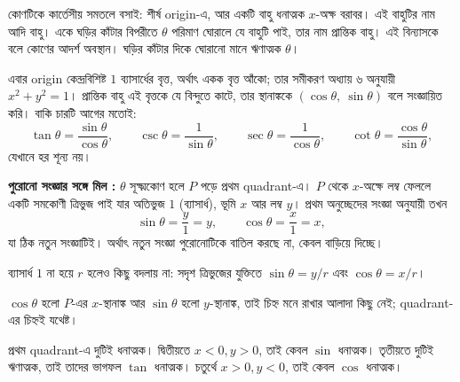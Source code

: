 \documentclass[11pt]{article}
\begin{document}
\begin{idea}
কোণটিকে কার্তেসীয় সমতলে বসাই: শীর্ষ origin-এ, আর একটি বাহু ধনাত্মক $x$-অক্ষ
বরাবর। এই বাহুটির নাম আদি বাহু। একে ঘড়ির কাঁটার বিপরীতে $\theta$ পরিমাণ ঘোরালে
যে বাহুটি পাই, তার নাম প্রান্তিক বাহু। এই বিন্যাসকে বলে কোণের আদর্শ অবস্থান।
ঘড়ির কাঁটার দিকে ঘোরানো মানে ঋণাত্মক $\theta$।

এবার origin কেন্দ্রবিশিষ্ট $1$ ব্যাসার্ধের বৃত্ত, অর্থাৎ একক বৃত্ত আঁকো; তার
সমীকরণ অধ্যায় ৬ অনুযায়ী $x^2 + y^2 = 1$। প্রান্তিক বাহু এই বৃত্তকে যে
বিন্দুতে কাটে, তার স্থানাঙ্ককে $(\cos\theta,\ \sin\theta)$ বলে সংজ্ঞায়িত করি।
বাকি চারটি আগের মতোই:
\[
  \tan\theta = \frac{\sin\theta}{\cos\theta}, \qquad
  \csc\theta = \frac{1}{\sin\theta}, \qquad
  \sec\theta = \frac{1}{\cos\theta}, \qquad
  \cot\theta = \frac{\cos\theta}{\sin\theta} ,
\]
যেখানে হর শূন্য নয়।
\end{idea}

\begin{center}
\end{center}

\noindent
\textbf{পুরোনো সংজ্ঞার সঙ্গে মিল : } $\theta$ সূক্ষ্মকোণ হলে $P$ পড়ে প্রথম
quadrant-এ। $P$ থেকে $x$-অক্ষে লম্ব ফেললে একটি সমকোণী ত্রিভুজ পাই যার অতিভুজ
$1$ (ব্যাসার্ধ), ভূমি $x$ আর লম্ব $y$। প্রথম অনুচ্ছেদের সংজ্ঞা অনুযায়ী তখন
\[
  \sin\theta = \frac{y}{1} = y, \qquad \cos\theta = \frac{x}{1} = x ,
\]
যা ঠিক নতুন সংজ্ঞাটিই। অর্থাৎ নতুন সংজ্ঞা পুরোনোটিকে বাতিল করছে না, কেবল
বাড়িয়ে দিচ্ছে।

ব্যাসার্ধ $1$ না হয়ে $r$ হলেও কিছু বদলায় না: সদৃশ ত্রিভুজের যুক্তিতে
$\sin\theta = y/r$ এবং $\cos\theta = x/r$।

\begin{idea}[চিহ্ন কোন quadrant-এ কী]
$\cos\theta$ হলো $P$-এর $x$-স্থানাঙ্ক আর $\sin\theta$ হলো $y$-স্থানাঙ্ক, তাই
চিহ্ন মনে রাখার আলাদা কিছু নেই; quadrant-এর চিহ্নই যথেষ্ট।

প্রথম quadrant-এ দুটিই ধনাত্মক। দ্বিতীয়তে $x<0, y>0$, তাই কেবল $\sin$
ধনাত্মক। তৃতীয়তে দুটিই ঋণাত্মক, তাই তাদের ভাগফল $\tan$ ধনাত্মক। চতুর্থে
$x>0, y<0$, তাই কেবল $\cos$ ধনাত্মক।
\end{idea}
\end{document}
